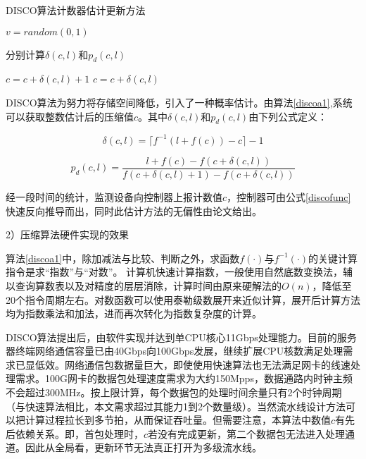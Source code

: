 \begin{algorithm}[ht]
	\caption{DISCO算法计数器估计更新方法 \label{discoa1}}
	\IncMargin{2em}
	\DontPrintSemicolon
	$ v = random(0,1) $
	
	分别计算$ \delta(c,l) $和$ p_d(c,l) $
	

	{$ c = c + \delta(c,l) +1 $ }
	{$ c = c + \delta(c,l) $ }
\end{algorithm}

DISCO算法为努力将存储空间降低，引入了一种概率估计。由算法\ref{discoa1},系统可以获取整数估计后的压缩值$c$。其中$ \delta(c,l) $和$ p_d(c,l) $由下列公式定义：

\begin{equation} \label{discofun2}
\delta(c,l)=\lceil f^{-1}(l+f(c)) - c \rceil - 1
\end{equation}

\begin{equation} \label{discofun3}
p_d(c,l) = \dfrac{l+f(c)-f(c+\delta(c,l))}{f(c+\delta(c,l)+1)-f(c+\delta(c,l))}
\end{equation}

经一段时间的统计，监测设备向控制器上报计数值$ c $，控制器可由公式\ref{discofunc}快速反向推导而出，同时此估计方法的无偏性由论文给出。


2）压缩算法硬件实现的效果

算法\ref{discoa1}中，除加减法与比较、判断之外，求函数$ f(\cdot)$与$ f^{-1}(\cdot) $的关键计算指令是求“指数”与“对数”。 计算机快速计算指数，一般使用自然底数变换法，辅以查询算数表以及对精度的层层消除，计算时间由原来硬解法的$ O(n) $，降低至20个指令周期左右。对数函数可以使用泰勒级数展开来近似计算，展开后计算方法均为指数乘法和加法，进而再次转化为指数复杂度的计算。

DISCO算法提出后，由软件实现并达到单CPU核心11Gbps处理能力。目前的服务器终端网络通信容量已由40Gbps向100Gbps发展，继续扩展CPU核数满足处理需求已显低效。网络通信包数据量巨大，即使使用快速算法也无法满足网卡的线速处理需求。100G网卡的数据包处理速度需求为大约150Mpps，数据通路内时钟主频不会超过300MHz。按上限计算，每个数据包的处理时间余量只有2个时钟周期（与快速算法相比，本文需求超过其能力1到2个数量级）。当然流水线设计方法可以把计算过程拉长到多节拍，从而保证吞吐量。但需要注意，本算法中数值$ c $有先后依赖关系。即，首包处理时，$ c $若没有完成更新，第二个数据包无法进入处理通道。因此从全局看，更新环节无法真正打开为多级流水线。

